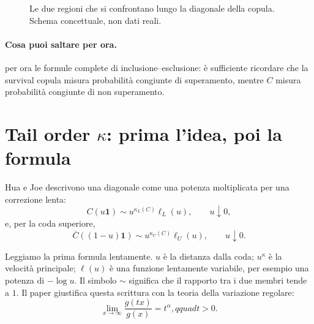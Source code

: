 \documentclass[11pt,a4paper]{article}
\newcommand{\one}{\boldsymbol{1}}
\newcommand{\Salta}{\paragraph{Cosa puoi saltare per ora.}}
\begin{document}
\begin{figure}[ht]
\centering
{}
\caption{Le due regioni che si confrontano lungo la diagonale della copula. Schema concettuale, non dati reali.}
\label{fig:copula-diagonal}
\end{figure}

\Salta per ora le formule complete di inclusione--esclusione: è sufficiente
ricordare che la survival copula misura probabilità congiunte di superamento,
mentre $C$ misura probabilità congiunte di non superamento.

\section{Tail order $\kappa$: prima l'idea, poi la formula}

Hua e Joe descrivono una diagonale come una potenza moltiplicata per una
correzione lenta:
\begin{equation}
 C(u\one)\sim u^{\kappa_L(C)}\ell_L(u),
 \qquad u\downarrow0,
 \label{eq:kappa-lower}
\end{equation}
e, per la coda superiore,
\begin{equation}
 \overline C((1-u)\one)\sim u^{\kappa_U(C)}\ell_U(u),
 \qquad u\downarrow0.
 \label{eq:kappa-upper}
\end{equation}

Leggiamo la prima formula lentamente. $u$ è la distanza dalla coda; $u^\kappa$
è la velocità principale; $\ell(u)$ è una funzione lentamente variabile, per
esempio una potenza di $-\log u$. Il simbolo $\sim$ significa che il rapporto
tra i due membri tende a $1$. Il paper giustifica questa scrittura con la
teoria della variazione regolare:
\[
 \lim_{x\to\infty}\frac{g(tx)}{g(x)}=t^\alpha,qquad t>0.
\]
\end{document}

